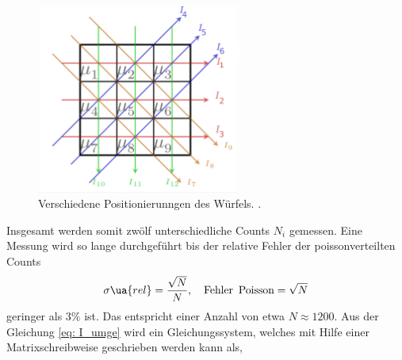 \begin{figure}[h]
  \centering
  \includegraphics[width=0.6\textwidth]{pics/positionierung.pdf}
  \caption{Verschiedene Positionierunngen des Würfels. \cite{luckyjosh}.} %
  \label{fig: positionierung}
\end{figure}

Insgesamt werden somit zwölf unterschiedliche Counts $N_i$ gemessen.
Eine Messung wird so lange durchgeführt bis der relative Fehler der poissonverteilten Counts%
\begin{equation*}
  \sigma\ua{rel}=\frac{\sqrt{N}}{N}, \quad \text{Fehler\, Poisson}= \sqrt{N}
\end{equation*}
geringer als $3\%$ ist. Das entspricht einer Anzahl von etwa $N\approx 1200$.
Aus der Gleichung \eqref{eq: I_umge} wird ein Gleichungssystem, welches mit Hilfe einer
Matrixschreibweise geschrieben werden kann als,


